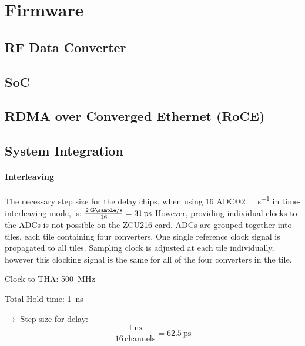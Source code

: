 \section{Firmware}
\subsection{RF Data Converter}
\subsection{SoC}
\subsection{RDMA over Converged Ethernet (RoCE)}

\subsection{System Integration}
\paragraph{Interleaving}
The necessary step size for the delay chips, when using 16 ADC@\SI{2}{\giga \sample \per \second} in time-interleaving mode, is: $\frac{\SI{2}{\giga \sample \per \second}}{16} = \SI{31}{\pico \second}$
However, providing individual clocks to the ADCs is not possible on the ZCU216 card. ADCs are grouped together into tiles, each tile containing four converters. One single reference clock signal is propagated to all tiles. Sampling clock is adjusted at each tile individually, however this clocking signal is the same for all of the four converters in the tile.

Clock to THA: \SI{500}{\mega \hertz}

Total Hold time: \SI{1}{\nano \second}

$\rightarrow$ Step size for delay:
\begin{equation}
\frac{\SI{1}{\nano \second}}{16 \, \text{channels}} = \SI{62.5}{\pico \second}
\end{equation}

